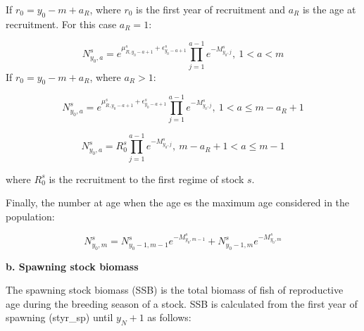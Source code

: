 \documentclass{article}
\begin{document}
If $r_0 = y_0-m+a_R$, where $r_0$ is the first year of recruitment and $a_R$ is the age at recruitment. For this case $a_R=1$:

\begin{equation}
N^s_{y_0,a}=e^{\mu_{R,y_0-a+1}^s + \epsilon^s_{y_0-a+1}}
            \prod_{j=1}^{a-1}e^{-M^s_{y_0,j}}, \ 1<a<m
\end{equation}
If $r_0 = y_0-m+a_R$, where $a_R>1$:

\begin{equation}
N^s_{y_0,a}=e^{\mu_{R,y_0-a+1}^s + \epsilon^s_{y_0-a+1}}                          \prod_{j=1}^{a-1}e^{-M^s_{y_0,j}}, \ 1<a\leq m-a_R+1
\end{equation}

\begin{equation}
N^s_{y_0,a}=R_0^s\prod_{j=1}^{a-1}e^{-M^s_{y_0,j}}, \ m-a_R+1<a\leq m-1
\end{equation}

where $R_0^s$ is the recruitment to the first regime of stock $s$.

Finally, the number at age when the age es the maximum age considered in the population:

\begin{equation}
N^s_{y_0,m}=N^s_{y_0-1,m-1}e^{-M^s_{y_0,m-1}}+N^s_{y_0-1,m}e^{-M^s_{y_0,m}}
\end{equation}




\textbf{b. Spawning stock biomass}

The spawning stock biomass (SSB) is the total biomass of fish of reproductive age during the breeding season of a stock. SSB is calculated from the first year of spawning (styr\_sp) until $y_N+1$ as follows:
\end{document}
